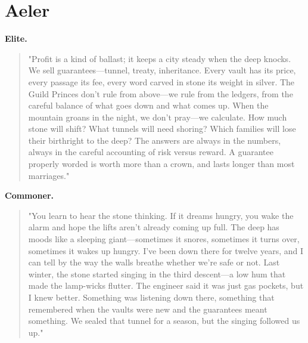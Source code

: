 \section*{Aeler}
\textbf{Elite.}
\begin{quote}
"Profit is a kind of ballast; it keeps a city steady when the deep knocks. We sell guarantees—tunnel, treaty, inheritance. Every vault has its price, every passage its fee, every word carved in stone its weight in silver. The Guild Princes don't rule from above—we rule from the ledgers, from the careful balance of what goes down and what comes up. When the mountain groans in the night, we don't pray—we calculate. How much stone will shift? What tunnels will need shoring? Which families will lose their birthright to the deep? The answers are always in the numbers, always in the careful accounting of risk versus reward. A guarantee properly worded is worth more than a crown, and lasts longer than most marriages."
\end{quote}
\textbf{Commoner.}
\begin{quote}
"You learn to hear the stone thinking. If it dreams hungry, you wake the alarm and hope the lifts aren't already coming up full. The deep has moods like a sleeping giant—sometimes it snores, sometimes it turns over, sometimes it wakes up hungry. I've been down there for twelve years, and I can tell by the way the walls breathe whether we're safe or not. Last winter, the stone started singing in the third descent—a low hum that made the lamp-wicks flutter. The engineer said it was just gas pockets, but I knew better. Something was listening down there, something that remembered when the vaults were new and the guarantees meant something. We sealed that tunnel for a season, but the singing followed us up."
\end{quote}

